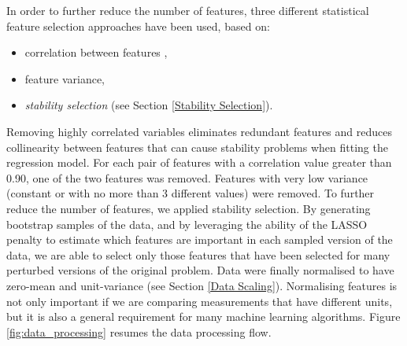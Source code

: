 In order to further reduce the number of features, three different statistical feature selection approaches have been used, based on:
\begin{itemize}
    \item correlation between features , 
    \item feature variance,
    \item \textit{stability selection} (see Section \ref{Stability Selection}).
\end{itemize}
%
Removing highly correlated variables eliminates redundant features and reduces collinearity between features that can cause stability problems when fitting the regression model.
For each pair of features with a correlation value greater than 0.90, one of the two features was removed. Features with very low variance (constant or with no more than 3 different values) were removed. To further reduce the number of features, we applied stability selection. By generating bootstrap samples of the data, and by leveraging the ability of the LASSO penalty to estimate which features are important in each sampled version of the data, we are able to select only those features that have been selected for many perturbed versions of the original problem. Data were finally normalised to have zero-mean and unit-variance (see Section \ref{Data Scaling}). Normalising features is not only important if we are comparing measurements that have different units, but it is also a general requirement for many machine learning algorithms. Figure \ref{fig:data_processing} resumes the data processing flow.
%
